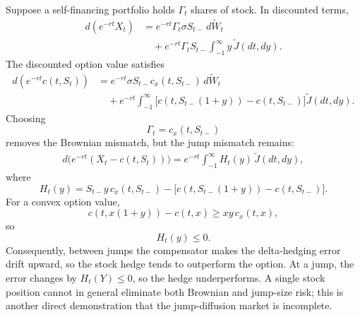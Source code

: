 Suppose a self-financing portfolio holds $\Gamma_t$ shares of stock. In discounted terms,
\[
\begin{aligned}
d(e^{-rt}X_t)
&=e^{-rt}\Gamma_t\sigma S_{t-}\,d\widetilde W_t\\
&\quad+e^{-rt}\Gamma_tS_{t-}
 \int_{-1}^{\infty}y\,\widetilde J(dt,dy).
\end{aligned}
\]
The discounted option value satisfies
\[
\begin{aligned}
d(e^{-rt}c(t,S_t))
&=e^{-rt}\sigma S_{t-}c_x(t,S_{t-})\,d\widetilde W_t\\
&\quad+e^{-rt}
 \int_{-1}^{\infty}
 \bigl[c(t,S_{t-}(1+y))-c(t,S_{t-})\bigr]
 \widetilde J(dt,dy).
\end{aligned}
\]
Choosing
\[
\Gamma_t=c_x(t,S_{t-})
\]
removes the Brownian mismatch, but the jump mismatch remains:
\[
\begin{aligned}
d\bigl(e^{-rt}(X_t-c(t,S_t))\bigr)
=e^{-rt}\int_{-1}^{\infty}H_t(y)\,\widetilde J(dt,dy),
\end{aligned}
\]
where
\[
H_t(y)
=S_{t-}y\,c_x(t,S_{t-})
-\bigl[c(t,S_{t-}(1+y))-c(t,S_{t-})\bigr].
\]
For a convex option value,
\[
c(t,x(1+y))-c(t,x)
\geq xy\,c_x(t,x),
\]
so
\[
H_t(y)\leq0.
\]
Consequently, between jumps the compensator makes the delta-hedging error drift upward, so the stock hedge tends to outperform the option. At a jump, the error changes by $H_t(Y)\leq0$, so the hedge underperforms. A single stock position cannot in general eliminate both Brownian and jump-size risk; this is another direct demonstration that the jump-diffusion market is incomplete.

